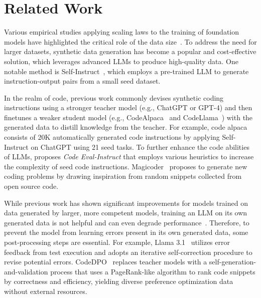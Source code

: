 \section{Related Work}
Various empirical studies applying scaling laws to the training of foundation models have highlighted the critical role of the data size~\cite{kaplan2020scaling,hoffmann2022training}. To address the need for larger datasets, synthetic data generation has become a popular and cost-effective solution, which leverages advanced LLMs to produce high-quality data.
One notable method is {\sc Self-Instruct}~\cite{wang2023self}, which employs a pre-trained LLM to generate instruction-output pairs from a small seed dataset.

In the realm of code, previous work commonly devises synthetic coding instructions using a stronger teacher model (e.g., ChatGPT or GPT-4) and then finetunes a weaker student model (e.g., {\sc CodeAlpaca}~\cite{codealpaca} and {\sc CodeLlama}~\cite{roziere2023code}) with the generated data to distill knowledge from the teacher. For example, code alpaca consists of 20K automatically generated code instructions by applying {\sc Self-Instruct} on ChatGPT using 21 seed tasks. To further enhance the code abilities of LLMs, \citet{luo2023wizardcoder} proposes \textit{Code Eval-Instruct} that employs various heuristics to increase the complexity of seed code instructions. Magicoder~\cite{wei2024magicoder} proposes to generate new coding problems by drawing inspiration from random snippets collected from open source code.


While previous work has shown significant improvements for models trained on data generated by larger, more competent models, training an LLM on its own generated data is not helpful and can even degrade performance~\cite{zhou2024lima}. Therefore, to prevent the model from learning errors present in its own generated data, some post-processing steps are essential. For example, Llama 3.1~\cite{dubey2024llama} utilizes error feedback from test execution and adopts an iterative self-correction procedure to revise potential errors.
CodeDPO~\cite{zhang2024codedpo} replaces teacher models with a self-generation-and-validation process that uses a PageRank-like algorithm to rank code snippets by correctness and efficiency, yielding diverse preference optimization data without external resources.

